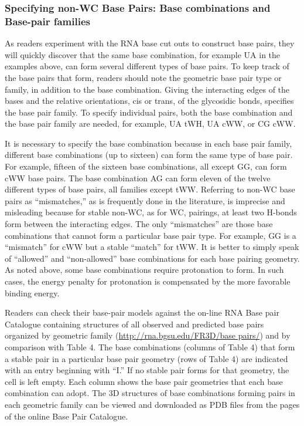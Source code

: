 \subsubsection{Specifying non-WC Base Pairs: Base combinations and Base-pair
families}

As readers experiment with the RNA base cut outs to construct base pairs, they
will quickly discover that the same base combination, for example UA in the
examples above, can form several different types of base pairs. To keep track of
the base pairs that form, readers should note the geometric base pair type or
family, in addition to the base combination. Giving the interacting edges of the
bases and the relative orientations, cis or trans, of the glycosidic bonds,
specifies the base pair family. To specify individual pairs, both the base
combination and the base pair family are needed, for example, UA tWH, UA cWW, or
CG cWW. 

It is necessary to specify the base combination because in each base pair
family, different base combinations (up to sixteen) can form the same type of
base pair. For example, fifteen of the sixteen base combinations, all except GG,
can form cWW base pairs. The base combination AG can form eleven of the twelve
different types of base pairs, all families except tWW. Referring to non-WC base
pairs as ``mismatches,'' as is frequently done in the literature, is imprecise and
misleading because for stable non-WC, as for WC, pairings, at least two H-bonds
form between the interacting edges. The only ``mismatches'' are those base
combinations that cannot form a particular base pair type. For example, GG is a
``mismatch'' for cWW but a stable ``match'' for tWW. It is better to simply speak of
``allowed'' and ``non-allowed'' base combinations for each base pairing geometry. As
noted above, some base combinations require protonation to form. In such cases,
the energy penalty for protonation is compensated by the more favorable binding
energy.

Readers can check their base-pair models against the on-line RNA Base pair
Catalogue containing structures of all observed and predicted base pairs
organized by geometric family (\url{http://rna.bgsu.edu/FR3D/base pairs/}) and
by comparison with Table 4. The base combinations (columns of Table 4) that form
a stable pair in a particular base pair geometry (rows of Table 4) are indicated
with an entry beginning with ``I.'' If no stable pair forms for that geometry, the
cell is left empty. Each column shows the base pair geometries that each base
combination can adopt. The 3D structures of base combinations forming pairs in
each geometric family can be viewed and downloaded as PDB files from the pages
of the online Base Pair Catalogue. 

